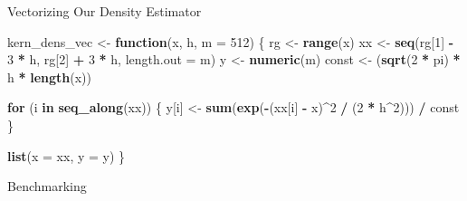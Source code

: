 \documentclass[
  ignorenonframetext,
  aspectratio=1610,
  onlytextwidth]{beamer}
\newenvironment{Shaded}{\begin{snugshade}}{\end{snugshade}}
\newcommand{\AttributeTok}[1]{\textcolor[rgb]{0.13,0.29,0.53}{#1}}
\newcommand{\ControlFlowTok}[1]{\textcolor[rgb]{0.13,0.29,0.53}{\textbf{#1}}}
\newcommand{\DecValTok}[1]{\textcolor[rgb]{0.00,0.00,0.81}{#1}}
\newcommand{\FloatTok}[1]{\textcolor[rgb]{0.00,0.00,0.81}{#1}}
\newcommand{\FunctionTok}[1]{\textcolor[rgb]{0.13,0.29,0.53}{\textbf{#1}}}
\newcommand{\NormalTok}[1]{#1}
\newcommand{\OtherTok}[1]{\textcolor[rgb]{0.56,0.35,0.01}{#1}}
\newcommand{\SpecialCharTok}[1]{\textcolor[rgb]{0.81,0.36,0.00}{\textbf{#1}}}
\begin{document}
\begin{frame}[fragile]{Vectorizing Our Density Estimator}
\label{vectorizing-our-density-estimator}
\begin{Shaded}
\begin{Highlighting}[]
\NormalTok{kern\_dens\_vec }\OtherTok{\textless{}{-}} \ControlFlowTok{function}\NormalTok{(x, h, }\AttributeTok{m =} \DecValTok{512}\NormalTok{) \{}
\NormalTok{  rg }\OtherTok{\textless{}{-}} \FunctionTok{range}\NormalTok{(x)}
\NormalTok{  xx }\OtherTok{\textless{}{-}} \FunctionTok{seq}\NormalTok{(rg[}\DecValTok{1}\NormalTok{] }\SpecialCharTok{{-}} \DecValTok{3} \SpecialCharTok{*}\NormalTok{ h, rg[}\DecValTok{2}\NormalTok{] }\SpecialCharTok{+} \DecValTok{3} \SpecialCharTok{*}\NormalTok{ h, }\AttributeTok{length.out =}\NormalTok{ m)}
\NormalTok{  y }\OtherTok{\textless{}{-}} \FunctionTok{numeric}\NormalTok{(m)}
\NormalTok{  const }\OtherTok{\textless{}{-}}\NormalTok{ (}\FunctionTok{sqrt}\NormalTok{(}\DecValTok{2} \SpecialCharTok{*}\NormalTok{ pi) }\SpecialCharTok{*}\NormalTok{ h }\SpecialCharTok{*} \FunctionTok{length}\NormalTok{(x))}

  \ControlFlowTok{for}\NormalTok{ (i }\ControlFlowTok{in} \FunctionTok{seq\_along}\NormalTok{(xx)) \{}
\NormalTok{    y[i] }\OtherTok{\textless{}{-}} \FunctionTok{sum}\NormalTok{(}\FunctionTok{exp}\NormalTok{(}\SpecialCharTok{{-}}\NormalTok{(xx[i] }\SpecialCharTok{{-}}\NormalTok{ x)}\SpecialCharTok{\^{}}\DecValTok{2} \SpecialCharTok{/}\NormalTok{ (}\DecValTok{2} \SpecialCharTok{*}\NormalTok{ h}\SpecialCharTok{\^{}}\DecValTok{2}\NormalTok{))) }\SpecialCharTok{/}\NormalTok{ const}
\NormalTok{  \}}

  \FunctionTok{list}\NormalTok{(}\AttributeTok{x =}\NormalTok{ xx, }\AttributeTok{y =}\NormalTok{ y)}
\NormalTok{\}}
\end{Highlighting}
\end{Shaded}
\end{frame}

\begin{frame}[fragile]{Benchmarking}
\label{benchmarking-1}
\begin{Shaded}
\end{Shaded}
\end{frame}
\end{document}
